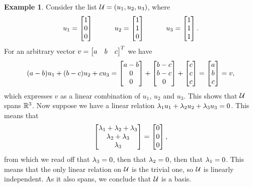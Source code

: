 \documentclass[reqno]{amsart}
\theoremstyle{definition}
\newtheorem{example}[theorem]{Example}
\begin{document}
\begin{example}\label{eg-basis-i}
 Consider the list $\mathcal{U}=(u_1,u_2,u_3)$, where
 \[ u_1 = \left[\begin{matrix} 1 \\ 0 \\ 0 \end{matrix}\right] \hspace{3em}
    u_2 = \left[\begin{matrix} 1 \\ 1 \\ 0 \end{matrix}\right] \hspace{3em}
    u_3 = \left[\begin{matrix} 1 \\ 1 \\ 1 \end{matrix}\right].
 \]
 For an arbitrary vector $v=\left[\begin{matrix} a & b & c\end{matrix}\right]^T$ we have
 \[ (a-b)u_1 + (b-c)u_2 + cu_3 =
     \left[\begin{matrix} a-b \\ 0 \\ 0 \end{matrix}\right] +
     \left[\begin{matrix} b-c \\ b-c \\ 0 \end{matrix}\right] +
     \left[\begin{matrix} c \\ c \\ c \end{matrix}\right] = \left[\begin{matrix} a \\ b \\ c \end{matrix}\right] = v,
 \]
 which expresses $v$ as a linear combination of $u_1$, $u_2$ and
 $u_3$.  This shows that $\mathcal{U}$ spans ${\mathbb{R}}^3$.  Now suppose we have a
 linear relation $\lambda_1u_1+\lambda_2u_2+\lambda_3u_3=0$.  This means that
 \[ \left[\begin{matrix} \lambda_1+\lambda_2+\lambda_3 \\ \lambda_2+\lambda_3 \\ \lambda_3 \end{matrix}\right] =
     \left[\begin{matrix} 0 \\ 0 \\ 0 \end{matrix}\right],
 \]
 from which we read off that $\lambda_3=0$, then that $\lambda_2=0$, then that
 $\lambda_1=0$.  This means that the only linear relation on $\mathcal{U}$ is the
 trivial one, so $\mathcal{U}$ is linearly independent.  As it also spans, we
 conclude that $\mathcal{U}$ is a basis.
\end{example}
\end{document}
